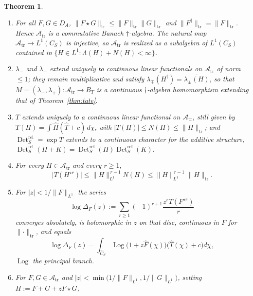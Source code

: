 \documentclass[11pt]{amsart}
\newtheorem{theorem}{Theorem}[section]
\theoremstyle{definition}
\theoremstyle{remark}
\newcommand{\Det}{\operatorname{Det}}
\newcommand{\Th}{\widehat{T}}
\newcommand{\Ch}{\widehat{C}_S}
\newcommand{\DA}{D_A}
\newcommand{\Atr}{\mathcal A_{\mathrm{tr}}}
\newcommand{\BT}{B_T}
\newcommand{\Log}{\operatorname{Log}}
\begin{document}
\begin{theorem}\label{thm:banach}
\begin{enumerate}
\item[(a)] For all $F,G\in\DA$,
$\lVert F\star G\rVert_{\mathrm{tr}}\le\lVert F\rVert_{\mathrm{tr}}
\lVert G\rVert_{\mathrm{tr}}$ and $\lVert F^{\dagger}\rVert_{\mathrm{tr}}
=\lVert F\rVert_{\mathrm{tr}}$.  Hence $\Atr$ is a commutative Banach
$\dagger$-algebra.  The natural map $\Atr\to L^{1}(C_S)$ is injective, so
$\Atr$ is realized as a subalgebra of $L^{1}(C_S)$ contained in
$\{H\in L^{1}:\Lambda(H)+N(H)<\infty\}$.
\item[(b)] $\lambda_-$ and $\lambda_+$ extend uniquely to continuous linear
functionals on $\Atr$ of norm $\le1$; they remain multiplicative and satisfy
$\lambda_{\mp}(H^{\dagger})=\overline{\lambda_{\pm}(H)}$, so that
$M=(\lambda_-,\lambda_+):\Atr\to\BT$ is a continuous $\dagger$-algebra
homomorphism extending that of Theorem~\ref{thm:tate}.
\item[(c)] $T$ extends uniquely to a continuous linear functional on $\Atr$,
still given by $T(H)=\int\widehat H(\Th+c)\,d\chi$, with $|T(H)|\le N(H)\le
\lVert H\rVert_{\mathrm{tr}}$; and $\Det^{\mathrm{rel}}_S=\exp T$ extends to a
continuous character for the additive structure,
$\Det^{\mathrm{rel}}_S(H+K)=\Det^{\mathrm{rel}}_S(H)\Det^{\mathrm{rel}}_S(K)$.
\item[(d)] For every $H\in\Atr$ and every $r\ge1$,
\begin{equation}\label{eq:powerest}
\bigl|T(H^{\star r})\bigr|\le\lVert H\rVert_{L^{1}}^{\,r-1}N(H)
\le\lVert H\rVert_{L^{1}}^{\,r-1}\lVert H\rVert_{\mathrm{tr}} .
\end{equation}
\item[(e)] For $|z|<1/\lVert F\rVert_{L^{1}}$ the series
\begin{equation}\label{eq:germ}
\log\Delta_F(z):=\sum_{r\ge1}(-1)^{r+1}\frac{z^{r}T(F^{\star r})}{r}
\end{equation}
converges absolutely, is holomorphic in $z$ on that disc, continuous in $F$ for
$\lVert\cdot\rVert_{\mathrm{tr}}$, and equals
\begin{equation}\label{eq:germint}
\log\Delta_F(z)=\int_{\Ch}\Log\bigl(1+z\widehat F(\chi)\bigr)
\bigl(\Th(\chi)+c\bigr)d\chi ,
\end{equation}
$\Log$ the principal branch.
\item[(f)] For $F,G\in\Atr$ and $|z|<\min\bigl(1/\lVert F\rVert_{L^{1}},
1/\lVert G\rVert_{L^{1}}\bigr)$, setting $H:=F+G+zF\star G$,
\begin{equation}\label{eq:multiplicative}

\end{equation}
\end{enumerate}
\end{theorem}
\end{document}
